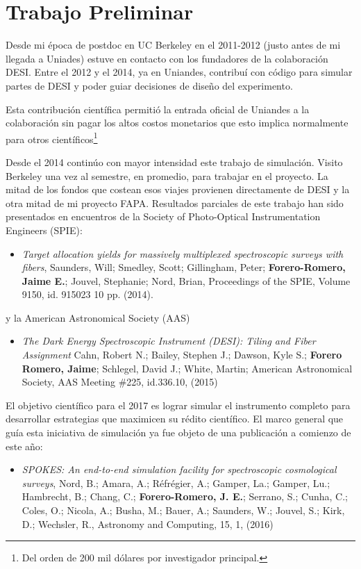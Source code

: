 \documentclass[12pt,spanish]{article}
\begin{document}
\section*{Trabajo Preliminar}

Desde mi \'epoca de postdoc en UC Berkeley en el 2011-2012 (justo
antes de mi llegada a Uniades) estuve en contacto con los fundadores
de la colaboraci\'on DESI. Entre el 2012 y el 2014, ya en Uniandes,
contribu\'i con c\'odigo para simular partes de DESI y poder
guiar decisiones de dise\~no del experimento.  

Esta contribuci\'on cient\'ifica permiti\'o la entrada oficial de
Uniandes a la colaboraci\'on sin pagar los altos costos monetarios que
esto implica normalmente para otros cient\'ificos\footnote{Del orden
  de 200 mil d\'olares por investigador principal.} 

Desde el 2014 contin\'uo con mayor intensidad este trabajo de
simulaci\'on. Visito Berkeley una vez al
semestre, en promedio, para trabajar en el proyecto.
La mitad de los fondos que costean esos viajes provienen directamente
de DESI y la otra mitad de mi proyecto FAPA. 
Resultados parciales de este trabajo han sido presentados en
encuentros de la Society of Photo-Optical Instrumentation Engineers
(SPIE):
\begin{itemize}
\item 
\textit {Target allocation yields for massively multiplexed
  spectroscopic surveys with fibers},  Saunders, Will; Smedley, Scott;
Gillingham, Peter; {\bf Forero-Romero, Jaime E.}; Jouvel, Stephanie; Nord, Brian, 
Proceedings of the SPIE, Volume 9150, id. 915023 10 pp. (2014).
\end{itemize}
%
y la  American Astronomical Society  (AAS)
\begin{itemize}
\item \textit{The Dark Energy Spectroscopic Instrument (DESI): Tiling and Fiber Assignment}
Cahn, Robert N.; Bailey, Stephen J.; Dawson, Kyle S.; {\bf Forero Romero,
Jaime}; Schlegel, David J.; White, Martin;
American Astronomical Society, AAS Meeting \#225, id.336.10, (2015)
\end{itemize}



El objetivo cient\'ifico para el 2017 es lograr simular el instrumento
completo para desarrollar estrategias que maximicen su r\'edito
cient\'ifico. 
El marco general que gu\'ia esta iniciativa de
simulaci\'on ya fue objeto de una publicaci\'on a comienzo de este a\~no:

\begin{itemize}
\item {\it SPOKES: An end-to-end simulation facility for
  spectroscopic cosmological surveys}, 
	Nord, B.; Amara, A.; R\'efr\'egier, A.; Gamper, La.; Gamper, Lu.;
        Hambrecht, B.; Chang, C.; {\bf Forero-Romero, J. E.}; Serrano, S.;
        Cunha, C.; Coles, O.; Nicola, A.; Busha, M.; Bauer, A.;
        Saunders, W.; Jouvel, S.; Kirk, D.; Wechsler, R., Astronomy
        and Computing, 15, 1, (2016)
\end{itemize}
\end{document}
